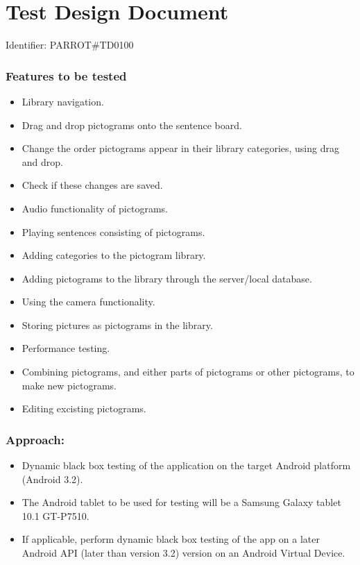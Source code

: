 \section{Test Design Document}

Identifier: PARROT\#TD0100

\subsubsection*{Features to be tested}
\begin{itemize}
	\item Library navigation.
	\item Drag and drop pictograms onto the sentence board.
	\item Change the order pictograms appear in their library categories, using drag and drop.
	\item Check if these changes are saved.
	\item Audio functionality of pictograms.
	\item Playing sentences consisting of pictograms.
	\item Adding categories to the pictogram library.
	\item Adding pictograms to the library through the server/local database.
	\item Using the camera functionality.
	\item Storing pictures as pictograms in the library.
	\item Performance testing.
	\item Combining pictograms, and either parts of pictograms or other pictograms, to make new pictograms.
	\item Editing excisting pictograms.
\end{itemize}

\subsubsection*{Approach:}
\begin{itemize}
	\item Dynamic black box testing of the application on the target Android platform (Android 3.2).
	\item The Android tablet to be used for testing will be a Samsung Galaxy tablet 10.1 GT-P7510.
	\item If applicable, perform dynamic black box testing of the app on a later Android API (later than version 3.2) version on an  Android Virtual Device.
\end{itemize}

